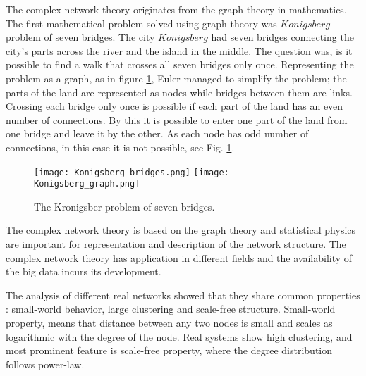 The complex network theory originates from the graph theory in mathematics. %
The first mathematical problem solved using graph theory was $Konigsberg$ problem of seven bridges. The city $Konigsberg$ had seven bridges connecting the city's parts across the river and the island in the middle. The question was, is it possible to find a walk that crosses all seven bridges only once. Representing the problem as a graph, as in figure \ref{fig:Krgraph}, Euler managed to simplify the problem; the parts of the land are represented as nodes while bridges between them are links. Crossing each bridge only once is possible if each part of the land has an even number of connections. By this it is possible to enter one part of the land from one bridge and leave it by the other. As each node has odd number of connections, in this case it is not possible, see Fig. \ref{fig:Krgraph}.

\begin{figure}[!ht]
	\centering
	\texttt{[image: Konigsberg\_bridges.png]} \hspace{2cm}
	\texttt{[image: Konigsberg\_graph.png]}
	\caption{The Kronigsber problem of seven bridges.}
	\label{fig:Krgraph}
\end{figure}

The complex network theory is based on the graph theory and statistical physics are important for representation and description of the network structure. The complex network theory has application in different fields and the availability of the big data incurs its development. 

The analysis of different real networks showed that they share common properties \cite{boccaletti2006complex}: small-world behavior, large clustering and scale-free structure. Small-world property, means that distance between any two nodes is small and scales as logarithmic with the degree of the node. Real systems show high clustering, and most prominent feature is scale-free property, where the degree distribution follows power-law. 

